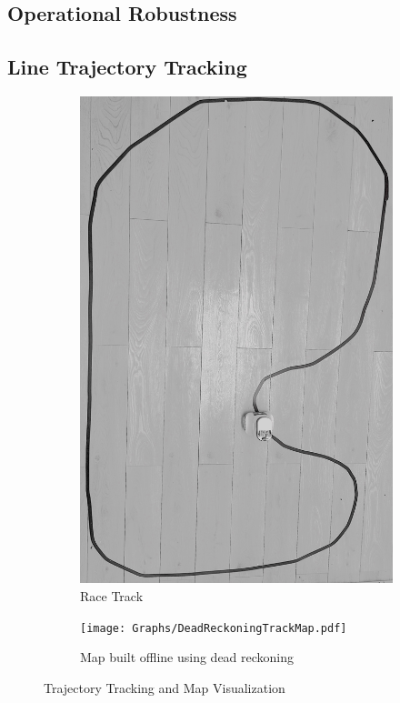     \subsection{Operational Robustness}
    \subsection{Line Trajectory Tracking}
    \begin{figure}[H]
        \centering
        \begin{subfigure}[b]{0.45\textwidth}
           
            \includegraphics[height=1.3\textwidth]{TrajTrak.jpeg}
            \caption{Race Track}
        \end{subfigure}
        \hfill
        \begin{subfigure}[b]{0.45\textwidth}
            \texttt{[image: Graphs/DeadReckoningTrackMap.pdf]}
            \caption{Map built offline using dead reckoning}
        \end{subfigure}
        \caption{Trajectory Tracking and Map Visualization}
        \label{fig:TrajTrack}
    \end{figure}
